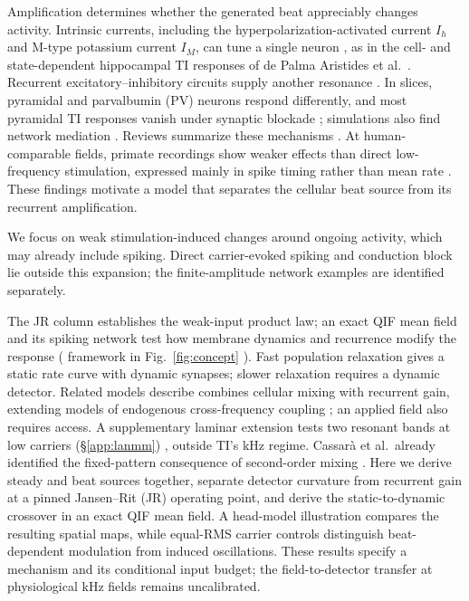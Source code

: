 \documentclass[11pt,a4paper]{article}
\providecommand{\DIFaddtex}[1]{{\protect\color{blue} \sf #1}} %
\providecommand{\DIFdeltex}[1]{{\protect\color{red} \scriptsize #1}} %
\providecommand{\DIFaddbegin}{} %
\providecommand{\DIFaddend}{} %
\providecommand{\DIFdelbegin}{} %
\providecommand{\DIFdelend}{} %
\providecommand{\DIFadd}[1]{\texorpdfstring{\DIFaddtex{#1}}{#1}} %
\providecommand{\DIFdel}[1]{\texorpdfstring{\DIFdeltex{#1}}{}} %
\begin{document}
Amplification determines whether the generated beat appreciably changes activity.
Intrinsic currents, including the hyperpolarization-activated current $I_h$ and
M-type potassium current $I_M$, can tune a single neuron \cite{hutcheonyarom2000},
as in the cell- and state-dependent hippocampal TI responses of de Palma Aristides
et al.\ \cite{depalma2026ti}. Recurrent excitatory--inhibitory circuits supply another
resonance \cite{brunelhakim1999,brunelwang2003,ledoux2011}. In slices, pyramidal and
parvalbumin (PV) neurons respond differently, and most pyramidal TI responses
vanish under synaptic blockade \cite{caldas2024}; simulations also find network
mediation \cite{karimi2024,esmaeilpour2021}. Reviews summarize these mechanisms
\cite{soroushi2025,wangw2026}. At human-comparable fields, primate recordings show
weaker effects than direct low-frequency stimulation, expressed mainly in spike
timing rather than mean rate \cite{vieira2024}.
\DIFdelbegin \DIFdel{These findings motivate a model
that separates the cellular beat source from its recurrent amplification.
}\DIFdelend

We focus on weak stimulation-induced changes around ongoing activity, which may
already include spiking. Direct carrier-evoked spiking and conduction block
\cite{opancar2025,peripheral2023,semenov2025} lie outside this expansion; the
finite-amplitude network examples are identified separately.

The \DIFdelbegin \DIFdel{JR column establishes the weak-input product law; an exact QIF mean field
and its spiking network test how membrane dynamics and recurrence modify the
response (}\DIFdelend \DIFaddbegin \DIFadd{framework in }\DIFaddend Fig.~\ref{fig:concept} \DIFdelbegin \DIFdel{). Fast population relaxation gives a static
rate curve with dynamic synapses; slower relaxation requires a dynamic detector.
Related models describe }\DIFdelend \DIFaddbegin \DIFadd{combines cellular mixing with recurrent
gain, extending models of }\DIFaddend endogenous cross-frequency coupling
\cite{ruffini2025cfc,ruffini2025ham}\DIFdelbegin \DIFdel{; an applied field also requires access. A supplementary laminar extension tests two resonant bands at low carriers
(\S\ref{app:lanmm}) , outside TI's kHz regime}\DIFdelend . \DIFaddbegin \DIFadd{Cassar\`a et al.\ already identified the
fixed-pattern consequence of second-order mixing \cite{cassara2025part2}.
Here we derive steady and beat sources together, separate detector curvature
from recurrent gain at a pinned Jansen--Rit (JR) operating point, and derive
the static-to-dynamic crossover in an exact QIF mean field. A head-model
illustration compares the resulting spatial maps, while equal-RMS carrier
controls distinguish beat-dependent modulation from induced oscillations.
These results specify a mechanism and its conditional input budget; the
field-to-detector transfer at physiological kHz fields remains uncalibrated.
}\DIFaddend
\end{document}
